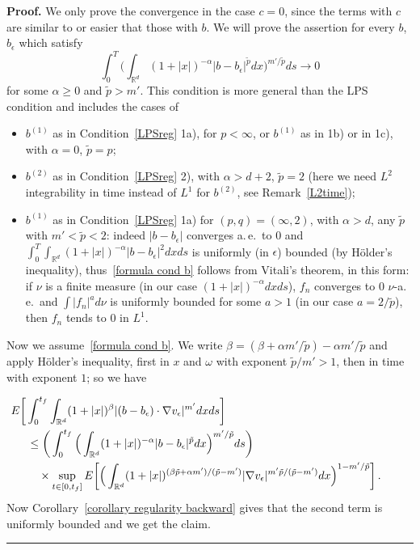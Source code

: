\documentclass[a4paper,10pt]{article}
\newenvironment{proof}[1][Proof]{\noindent\textbf{#1.} }{\ \rule{0.5em}{0.5em}}
\newcommand{\mr}{\mathbb{R}}
\newcommand{\td}{\tilde}
\newcommand{\eps}{\epsilon}
\begin{document}
\begin{proof}
We only prove the convergence in the case $c=0$, since the terms with $c$ are similar to or easier that those with $b$. We will prove the assertion for every $b$, $b_\eps$ which satisfy
\begin{equation}
\int^T_0 \Big( \int_{\mr^d}(1+|x|)^{-\alpha}|b-b_\eps|^{\td{p}}dx \Big)^{m'/\td{p}}ds\rightarrow0\label{formula cond b}
\end{equation}
for some $\alpha\ge0$ and $\td{p}>m'$. This condition is more general than the LPS condition and includes the cases of
\begin{itemize}
\item $b^{(1)}$ as in Condition~\ref{LPSreg} 1a), for $p<\infty$, or $b^{(1)}$ as in 1b) or in 1c), with $\alpha=0$, $\td{p}=p$;
\item $b^{(2)}$ as in Condition~\ref{LPSreg} 2), with $\alpha>d+2$, $\td{p}=2$ (here we need $L^2$ integrability in time instead of $L^1$ for $b^{(2)}$, see Remark~\ref{L2time});
\item $b^{(1)}$ as in Condition~\ref{LPSreg} 1a) for $(p,q)=(\infty,2)$, with $\alpha>d$, any $\td{p}$ with $m'<\td{p}<2$: indeed $|b-b_\eps|$ converges a.\,e.\ to $0$ and $\int^T_0\int_{\mr^d}(1+|x|)^{-\alpha}|b-b_\eps|^2dxds$ is uniformly (in $\eps$) bounded (by H\"older's inequality), thus~\eqref{formula cond b} follows from Vitali's theorem, in this form: if $\nu$ is a finite measure (in our case $(1+|x|)^{-\alpha}dxds$), $f_n$ converges to $0$ $\nu$-a.\,e.\ and $\int|f_n|^ad\nu$ is uniformly bounded for some $a>1$ (in our case $a=2/\td{p}$), then $f_n$ tends to $0$ in $L^1$.
\end{itemize}

Now we assume~\eqref{formula cond b}. We write $\beta=(\beta+\alpha m'/\td{p})-\alpha m'/\td{p}$ and apply H\"older's inequality, first in $x$ and $\omega$ with exponent $\td{p}/m'>1$, then in time with exponent $1$; so we have
 
\begin{align*}
\lefteqn{\hspace{-0.5cm} E \bigg[ \int^{t_f}_0\int_{\mr^d}(1+|x|)^\beta|(b-b_\eps)\cdot\nabla v_\eps|^{m'}dxds \bigg] } \\
& \le \bigg(\int^{t_f}_0\Big(\int_{\mr^d}(1+|x|)^{-\alpha}|b-b_\eps|^{\td{p}}dx\Big)^{m'/\td{p}}ds \bigg)\\
& \quad {}\times \sup_{t\in[0,t_f]} E\bigg[ \Big(\int_{\mr^d}(1+|x|)^{(\beta\td{p}+\alpha m')/(\td{p}-m')} |\nabla v_\eps|^{m'\td{p}/(\td{p}-m')} dx \Big)^{1-m'/\td{p}} \bigg] \,.
\end{align*}
Now Corollary~\ref{corollary regularity backward} gives that the second term is uniformly bounded and we get the claim.
\end{proof}
\end{document}
